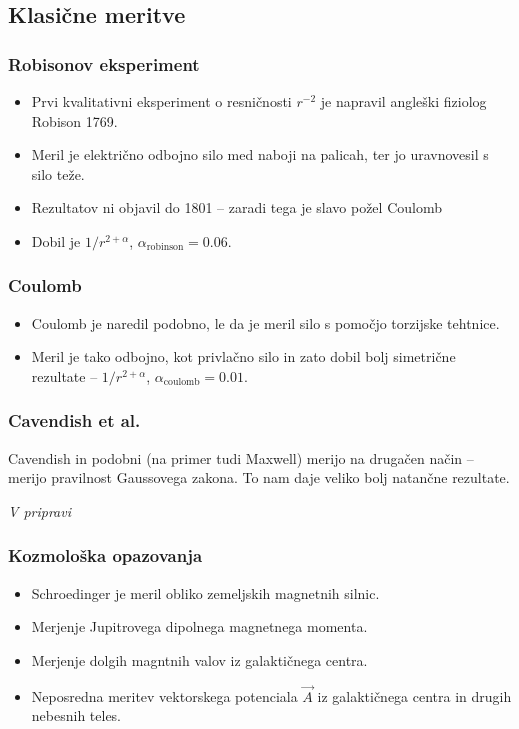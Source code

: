 \documentclass{beamer}
\begin{document}
\subsection{Klasične meritve}

\begin{frame}[t]
	\frametitle{Robisonov eksperiment}
	\begin{itemize}
		\item{Prvi kvalitativni eksperiment o resničnosti $r^{-2}$ je napravil angleški fiziolog Robison 1769.}
		\item{Meril je električno odbojno silo med naboji na palicah, ter jo uravnovesil s silo teže.}
		\item{Rezultatov ni objavil do 1801 -- zaradi tega je slavo požel Coulomb}
		\item{Dobil je $1/r^{2+\alpha}$, $\alpha_\text{robinson} = 0.06$}.
	\end{itemize}
\end{frame}

\begin{frame}[t]
	\frametitle{Coulomb}
	\begin{itemize}
		\item{Coulomb je naredil podobno, le da je meril silo s pomočjo torzijske tehtnice.}
		\item{Meril je tako odbojno, kot privlačno silo in zato dobil bolj simetrične rezultate -- $1/r^{2+\alpha}$,
			$\alpha_\text{coulomb} = 0.01$.}
	\end{itemize}
\end{frame}

\begin{frame}[t]
	\frametitle{Cavendish et al.}
	Cavendish in podobni (na primer tudi Maxwell) merijo na drugačen način -- merijo pravilnost Gaussovega zakona. To nam daje veliko
	bolj natančne rezultate.

	\emph{V pripravi}
\end{frame}

\begin{frame}[t]
	\frametitle{Kozmološka opazovanja}
	\begin{itemize}
		\item{Schroedinger je meril obliko zemeljskih magnetnih silnic.}
		\item{Merjenje Jupitrovega dipolnega magnetnega momenta.}
		\item{Merjenje dolgih magntnih valov iz galaktičnega centra.}
		\item{Neposredna meritev vektorskega potenciala $\vec{A}$ iz galaktičnega centra in
			drugih nebesnih teles.}		
	\end{itemize}
\end{frame}
\end{document}
